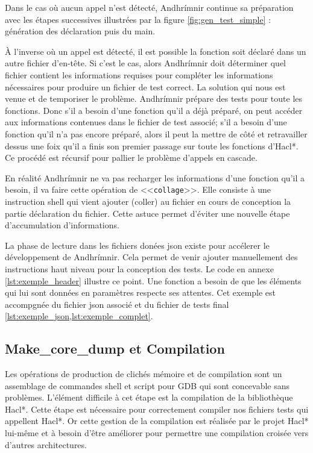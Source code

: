 Dans le cas où aucun appel n'est détecté, Andhrímnir continue sa préparation avec les étapes successives illustrées par la figure \ref{fig:gen_test_simple} : génération des déclaration puis du main.\smallbreak

À l'inverse où un appel est détecté, il est possible la fonction soit déclaré dans un autre fichier d'en-tête. Si c'est le cas, alors Andhrímnir doit déterminer quel fichier contient les informations requises pour compléter les informations nécessaires pour produire un fichier de test correct. La solution qui nous est venue et de temporiser le problème. Andhrímnir prépare des tests pour toute les fonctions. Donc s'il a besoin d'une fonction qu'il a déjà préparé, on peut accéder aux informations contenues dans le fichier de test associé; s'il a besoin d'une fonction qu'il n'a pas encore préparé, alors il peut la mettre de côté et retravailler dessus une foix qu'il a finis son premier passage sur toute les fonctions d'Hacl*. Ce procédé est récursif pour pallier le problème d'appels en cascade.\smallbreak

En réalité Andhrímnir ne va pas recharger les informations d'une fonction qu'il a besoin, il va faire cette opération de <<\texttt{collage}>>. Elle consiste à une instruction shell qui vient ajouter (coller) au fichier en cours de conception la partie déclaration du fichier. Cette astuce permet d'éviter une nouvelle étape d'accumulation d'informations.\medbreak

La phase de lecture dans les fichiers donées json existe pour accélerer le développement de Andhrímnir. Cela permet de venir ajouter manuellement des instructions haut niveau pour la conception des tests. Le code en annexe \ref{lst:exemple_header} illustre ce point. Une fonction a besoin de que les éléments qui lui sont données en paramètres respecte ses attentes. Cet exemple est accompgnée du fichier json associé et du fichier de tests final \ref{lst:exemple_json,lst:exemple_complet}.  


\subsection*{Make\_core\_dump et Compilation}

Les opérations de production de clichés mémoire et de compilation sont un assemblage de commandes shell et script pour GDB qui sont concevable sans problèmes. L'élément difficile à cet étape est la compilation de la bibliothèque Hacl*. Cette étape est nécessaire pour correctement compiler nos fichiers tests qui appellent Hacl*. Or cette gestion de la compilation est réalisée par le projet Hacl* lui-même et à besoin d'être améliorer pour permettre une compilation croisée vers d'autres architectures.\smallbreak

